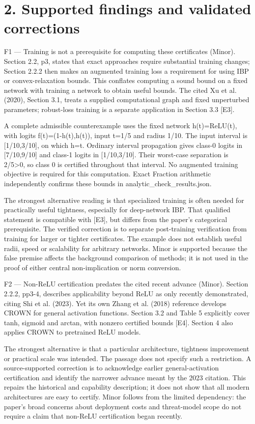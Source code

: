 \documentclass[10pt]{article}
\begin{document}
\section*{2. Supported findings and validated corrections}
F1 — Training is not a prerequisite for computing these certificates (Minor). Section 2.2, p3, states that exact approaches require substantial training changes; Section 2.2.2 then makes an augmented training loss a requirement for using IBP or convex-relaxation bounds. This conflates computing a sound bound on a fixed network with training a network to obtain useful bounds. The cited Xu et al. (2020), Section 3.1, treats a supplied computational graph and fixed unperturbed parameters; robust-loss training is a separate application in Section 3.3 [E3].\par
A complete admissible counterexample uses the fixed network h(t)=ReLU(t), with logits f(t)=(1-h(t),h(t)), input t=1/5 and radius 1/10. The input interval is [1/10,3/10], on which h=t. Ordinary interval propagation gives class-0 logits in [7/10,9/10] and class-1 logits in [1/10,3/10]. Their worst-case separation is 2/5>0, so class 0 is certified throughout that interval. No augmented training objective is required for this computation. Exact Fraction arithmetic independently confirms these bounds in analytic\_check\_results.json.\par
The strongest alternative reading is that specialized training is often needed for practically useful tightness, especially for deep-network IBP. That qualified statement is compatible with [E3], but differs from the paper’s categorical prerequisite. The verified correction is to separate post-training verification from training for larger or tighter certificates. The example does not establish useful radii, speed or scalability for arbitrary networks. Minor is supported because the false premise affects the background comparison of methods; it is not used in the proof of either central non-implication or norm conversion.\par
F2 — Non-ReLU certification predates the cited recent advance (Minor). Section 2.2.2, pp3-4, describes applicability beyond ReLU as only recently demonstrated, citing Shi et al. (2023). Yet its own Zhang et al. (2018) reference develops CROWN for general activation functions. Section 3.2 and Table 5 explicitly cover tanh, sigmoid and arctan, with nonzero certified bounds [E4]. Section 4 also applies CROWN to pretrained ReLU models.\par
The strongest alternative is that a particular architecture, tightness improvement or practical scale was intended. The passage does not specify such a restriction. A source-supported correction is to acknowledge earlier general-activation certification and identify the narrower advance meant by the 2023 citation. This repairs the historical and capability description; it does not show that all modern architectures are easy to certify. Minor follows from the limited dependency: the paper’s broad concerns about deployment costs and threat-model scope do not require a claim that non-ReLU certification began recently.\par
\end{document}
